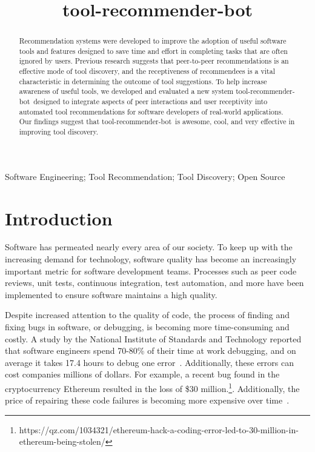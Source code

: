 \documentclass[conference]{IEEEtran}
\newcommand{\tool}{tool-recommender-bot}
\begin{document}

\title{\tool}

\author{
}

\maketitle
\begin{abstract}
Recommendation systems were developed to improve the adoption of useful software tools and features designed to save time and effort in completing tasks that are often ignored by users. Previous research suggests that peer-to-peer recommendations is an effective mode of tool discovery, and the receptiveness of recommendees is a vital characteristic in determining the outcome of tool suggestions. To help increase awareness of useful tools, we developed and evaluated a new system \tool~designed to integrate aspects of peer interactions and user receptivity into automated tool recommendations for software developers of real-world applications. Our findings suggest that \tool~is awesome, cool, and very effective in improving tool discovery.
\end{abstract}

\begin{IEEEkeywords}
Software Engineering; Tool Recommendation; Tool Discovery; Open Source
\end{IEEEkeywords}

\section{Introduction}

Software has permeated nearly every area of our society. To keep up with the increasing demand for technology, software quality has become an increasingly important metric for software development teams. Processes such as peer code reviews, unit tests, continuous integration, test automation, and more have been implemented to ensure software maintains a high quality. 

Despite increased attention to the quality of code, the process of finding and fixing bugs in software, or debugging, is becoming more time-consuming and costly.  A study by the National Institute of Standards and Technology reported that software engineers spend 70-80\% of their time at work debugging, and on average it takes 17.4 hours to debug one error~\cite{NIST}. Additionally, these errors can cost companies millions of dollars.  For example, a recent bug found in the cryptocurrency Ethereum resulted in the loss of \$30 million.\footnote{https://qz.com/1034321/ethereum-hack-a-coding-error-led-to-30-million-in-ethereum-being-stolen/}. Additionally, the price of repairing these code failures is becoming more expensive over time~\cite{SEEconomics}.
\end{document}
